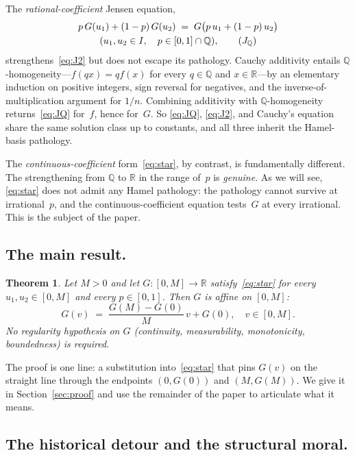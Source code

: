 \documentclass{article}
\theoremstyle{plain}
\newtheorem{theorem}{Theorem}
\theoremstyle{definition}
\newcommand{\R}{\mathbb{R}}
\newcommand{\Q}{\mathbb{Q}}
\begin{document}
The \emph{rational-coefficient} Jensen equation,
\begin{multline}
p\,G(u_1)+(1-p)\,G(u_2)
  \;=\; G\bigl(p\,u_1+(1-p)\,u_2\bigr) \\
  (u_1,u_2\in I,\quad p\in[0,1]\cap\Q),
\tag{$J_\Q$}\label{eq:JQ}
\end{multline}
strengthens~\eqref{eq:J2} but does not escape its pathology. Cauchy
additivity entails $\Q$-homogeneity---$f(qx)=qf(x)$ for every $q\in\Q$
and $x\in\R$---by an elementary induction on positive integers, sign
reversal for negatives, and the inverse-of-multiplication argument for
$1/n$. Combining additivity with $\Q$-homogeneity
returns~\eqref{eq:JQ} for~$f$, hence for~$G$. So \eqref{eq:JQ},
\eqref{eq:J2}, and Cauchy's equation share the same solution class up to
constants, and all three inherit the Hamel-basis pathology.

The \emph{continuous-coefficient} form~\eqref{eq:star}, by contrast, is
fundamentally different. The strengthening from $\Q$ to $\R$ in the
range of~$p$ is \emph{genuine}. As we will see, \eqref{eq:star} does not
admit any Hamel pathology: the pathology cannot survive at irrational~$p$,
and the continuous-coefficient equation tests~$G$ at every irrational.
This is the subject of the paper.

\subsection{The main result.}

\begin{theorem}\label{thm:main}
Let $M>0$ and let $G\colon[0,M]\to\R$ satisfy~\eqref{eq:star} for every
$u_1,u_2\in[0,M]$ and every $p\in[0,1]$. Then $G$ is affine on $[0,M]$:
\[
G(v) \;=\; \frac{G(M)-G(0)}{M}\,v + G(0), \quad v\in[0,M].
\]
No regularity hypothesis on $G$ (continuity, measurability,
monotonicity, boundedness) is required.
\end{theorem}

The proof is one line: a substitution into~\eqref{eq:star} that pins
$G(v)$ on the straight line through the endpoints $(0,G(0))$ and
$(M,G(M))$.
We give it in Section~\ref{sec:proof} and use the remainder of the paper
to articulate what it means.

\subsection{The historical detour and the structural moral.}
\label{ssec:detour}
\end{document}

